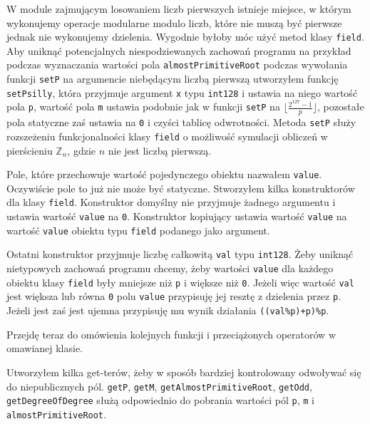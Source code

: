 \documentclass{article}
\begin{document}
W module zajmującym losowaniem liczb pierwszych istnieje miejsce, w którym wykonujemy operacje modularne modulo liczb,
które nie muszą być pierwsze jednak nie wykonujemy dzielenia. Wygodnie byłoby móc użyć metod klasy 
\texttt{field}. Aby uniknąć potencjalnych niespodziewanych zachowań programu na przykład podczas wyznaczania wartości pola 
\texttt{almostPrimitiveRoot} podczas wywołania funkcji \texttt{setP} na 
argumencie niebędącym liczbą pierwszą utworzyłem funkcję \texttt{setPsilly}, która przyjmuje argument
\texttt{x} typu \texttt{\textunderscore \textunderscore int128} i ustawia na niego wartość
pola \texttt{p}, wartość pola \texttt{m} ustawia podobnie jak w funkcji \texttt{setP} na  
$\lfloor \frac{2^{127}-1}{p} \rfloor$, pozostałe pola statyczne zaś ustawia na \texttt{0} i czyści tablicę odwrotności.
Metoda \texttt{setP} służy rozszeżeniu funkcjonalności klasy \texttt{field} o możliwość symulacji obliczeń w 
pierścieniu $\mathbb{Z}_n$, gdzie $n$ nie jest liczbą pierwszą.



Pole, które przechowuje wartość pojedynczego obiektu nazwałem \texttt{value}. Oczywiście
pole to już nie może być statyczne.
Stworzyłem kilka konstruktorów dla klasy \texttt{field}. Konstruktor domyślny
nie przyjmuje żadnego argumentu i ustawia wartość \texttt{value} na \texttt{0}.
Konstruktor kopiujący ustawia wartość \texttt{value} na wartość \texttt{value} obiektu 
typu \texttt{field} podanego jako argument. 

Ostatni konstruktor przyjmuje liczbę całkowitą \texttt{val} 
typu \texttt{\textunderscore \textunderscore int128}. Żeby uniknąć nietypowych zachowań programu chcemy, żeby wartości \texttt{value} dla 
każdego obiektu klasy \texttt{field} były mniejsze niż \texttt{p} i większe niż \texttt{0}. Jeżeli więc wartość \texttt{val}
jest większa lub równa \texttt{0} polu \texttt{value} przypisuję
jej resztę z dzielenia przez \texttt{p}. Jeżeli jest zaś jest ujemna przypisuję mu wynik działania \texttt{((val\%p)+p)\%p}.



Przejdę teraz do omówienia kolejnych funkcji i przeciążonych operatorów
w omawianej klasie.

Utworzyłem kilka get-terów, żeby w sposób bardziej kontrolowany odwoływać się do niepublicznych pól. 
\texttt{getP}, \texttt{getM}, \texttt{getAlmostPrimitiveRoot}, \texttt{getOdd}, \texttt{getDegreeOfDegree}
służą odpowiednio do pobrania wartości pól \texttt{p}, \texttt{m} i \texttt{almostPrimitiveRoot}.
\end{document}
